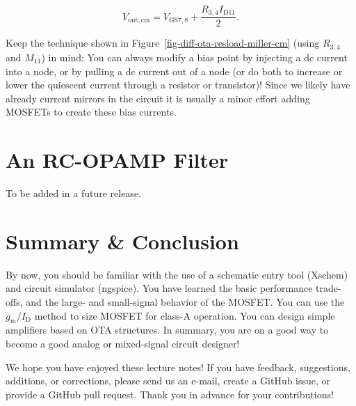 \documentclass[
  a4paper,
  DIV=11,
  numbers=noendperiod]{scrartcl}
\begin{document}
\[
V_\mathrm{out,cm} = V_\mathrm{GS7,8} + \frac{R_{3,4} I_\mathrm{D11}}{2}.
\]

\begin{tcolorbox}[enhanced jigsaw, colframe=quarto-callout-warning-color-frame, opacityback=0, title=\textcolor{quarto-callout-warning-color}{\faExclamationTriangle}\hspace{0.5em}{Modify Bias Points with Currents}, bottomtitle=1mm, breakable, toprule=.15mm, colbacktitle=quarto-callout-warning-color!10!white, rightrule=.15mm, arc=.35mm, toptitle=1mm, coltitle=black, bottomrule=.15mm, leftrule=.75mm, titlerule=0mm, colback=white, opacitybacktitle=0.6, left=2mm]

Keep the technique shown in Figure~\ref{fig-diff-ota-resload-miller-cm}
(using \(R_{3,4}\) and \(M_{11}\)) in mind: You can always modify a bias
point by injecting a dc current into a node, or by pulling a dc current
out of a node (or do both to increase or lower the quiescent current
through a resistor or transistor)! Since we likely have already current
mirrors in the circuit it is usually a minor effort adding MOSFETs to
create these bias currents.

\end{tcolorbox}

\section{An RC-OPAMP Filter}\label{an-rc-opamp-filter}

To be added in a future release.

\section{Summary \& Conclusion}\label{summary-conclusion}

By now, you should be familiar with the use of a schematic entry tool
(Xschem) and circuit simulator (ngspice). You have learned the basic
performance trade-offs, and the large- and small-signal behavior of the
MOSFET. You can use the \(g_\mathrm{m}/I_\mathrm{D}\) method to size
MOSFET for class-A operation. You can design simple amplifiers based on
OTA structures. In summary, you are on a good way to become a good
analog or mixed-signal circuit designer!

\begin{tcolorbox}[enhanced jigsaw, colframe=quarto-callout-important-color-frame, opacityback=0, title=\textcolor{quarto-callout-important-color}{\faExclamation}\hspace{0.5em}{Feedback}, bottomtitle=1mm, breakable, toprule=.15mm, colbacktitle=quarto-callout-important-color!10!white, rightrule=.15mm, arc=.35mm, toptitle=1mm, coltitle=black, bottomrule=.15mm, leftrule=.75mm, titlerule=0mm, colback=white, opacitybacktitle=0.6, left=2mm]

We hope you have enjoyed these lecture notes! If you have feedback,
suggestions, additions, or corrections, please send us an e-mail, create
a GitHub issue, or provide a GitHub pull request. Thank you in advance
for your contributions!

\end{tcolorbox}
\end{document}
